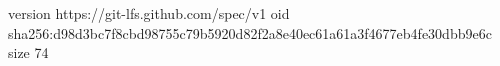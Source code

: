 version https://git-lfs.github.com/spec/v1
oid sha256:d98d3bc7f8cbd98755c79b5920d82f2a8e40ec61a61a3f4677eb4fe30dbb9e6c
size 74
